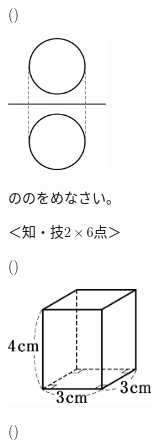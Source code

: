 \documentclass[
  12pt,a4paper,lualatex,ja=standard]{bxjsarticle}
\begin{document}
\begin{flushleft}
\begin{multicols}{2}
\begin{center}
\end{center}

\columnbreak

()\hspace{2.5pt}

\begin{center}
\def\@captype{figure}
\includegraphics[height=35mm]{img/img6.jpg}

\end{center}

\end{multicols}

\vfill
\newpage

\setcounter{skaunta}{0}
\noindent{} \hspace{1pt}ののをめなさい。

%
\begin{flushright}%
\footnotesize{＜知・技$2 \times 6$点＞}%
\end{flushright}%


\begin{multicols}{3}

()\hspace{2.5pt}

\begin{center}
\def\@captype{figure}
\includegraphics[height=30mm]{img/img7.jpg}

\end{center}

\columnbreak

()\hspace{2.5pt}


\end{multicols}
\end{flushleft}
\end{document}
